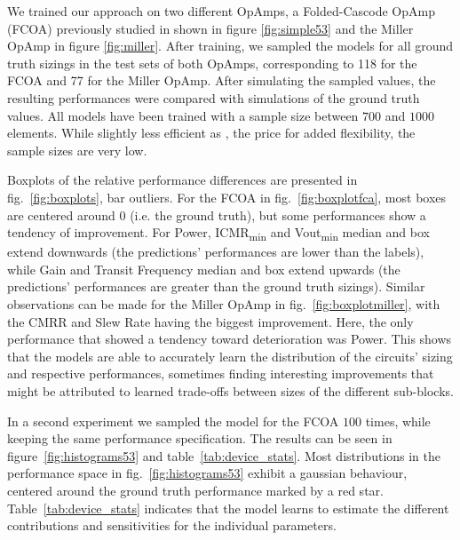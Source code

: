 \documentclass[conference]{IEEEtran}
\begin{document}
	We trained our approach on two different OpAmps, a Folded-Cascode OpAmp (FCOA) previously studied in \cite{leibl24inverse} shown in figure \ref{fig:simple53} and the Miller OpAmp in figure \ref{fig:miller}. After training, we sampled the models for all ground truth sizings in the test sets of both OpAmps, corresponding to 118 for the FCOA and 77 for the Miller OpAmp. After simulating the sampled values, the resulting performances were compared with simulations of the ground truth values. 
	All models have been trained with a sample size between $700$ and $1000$ elements. While slightly less efficient as \cite{leibl24inverse}, the price for added flexibility, the sample sizes are very low.
	
	Boxplots of the relative performance differences are presented in fig.~\ref{fig:boxplots}, bar outliers.
	For the FCOA in fig.~\ref{fig:boxplotfca}, most boxes are centered around 0 (i.e. the ground truth), but some performances show a tendency of improvement. For Power, ICMR\textsubscript{min} and Vout\textsubscript{min} median and box extend downwards (the predictions' performances are lower than the labels), while Gain and Transit Frequency median and box extend upwards (the predictions' performances are greater than the ground truth sizings). Similar observations can be made for the Miller OpAmp in fig.~\ref{fig:boxplotmiller}, with the CMRR and Slew Rate having the biggest improvement. Here, the only performance that showed a tendency toward deterioration was Power. This shows that the models are able to accurately learn the distribution of the circuits' sizing and respective performances, sometimes finding interesting improvements that might be attributed to learned trade-offs between sizes of the different sub-blocks.
	
	In a second experiment we sampled the model for the FCOA $100$ times, while keeping the same performance specification. The results can be seen in figure~\ref{fig:histograms53} and table~\ref{tab:device_stats}. Most distributions in the performance space in fig.~\ref{fig:histograms53} exhibit a gaussian behaviour, centered around the ground truth performance marked by a red star. Table~\ref{tab:device_stats} indicates that the model learns to estimate the different contributions and sensitivities for the individual parameters. 
\end{document}
